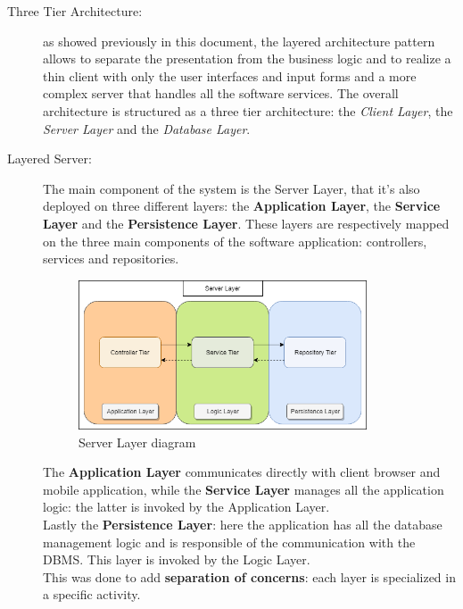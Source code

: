 \documentclass[a4paper]{article}
\begin{document}
    \begin{description}
        \item[Three Tier Architecture:] as showed previously in this document, the layered architecture pattern allows to separate the presentation from the business logic and to realize a thin client with only the user interfaces and input forms and a more complex server that handles all the software services.
        The overall architecture is structured as a three tier architecture: the \textit{Client Layer}, the \textit{Server Layer} and the \textit{Database Layer}.
        
        \item[Layered Server:] The main component of the system is the Server Layer, that it's also deployed on three different layers: the \textbf{Application Layer}, the \textbf{Service Layer} and the \textbf{Persistence Layer}.
        These layers are respectively mapped on the three main components of the software application: \newline controllers, services and repositories.
        \begin{figure}[!htpb]
            	\centering
            	\includegraphics[width=0.84\textwidth,keepaspectratio]{DD/images/ServerLayer.png}
            	\caption{Server Layer diagram}
        \end{figure}
        \newline
        The \textbf{Application Layer} communicates directly with client browser and mobile application, while the \textbf{Service Layer} manages all the application logic: the latter is invoked by the Application Layer. \\
        Lastly the \textbf{Persistence Layer}: here the application has all the database management logic and is responsible of the communication with the DBMS. This layer is invoked by the Logic Layer.\\
        This was done to add \textbf{separation of concerns}: each layer is specialized in a specific activity.
        

\end{description}
\end{document}
